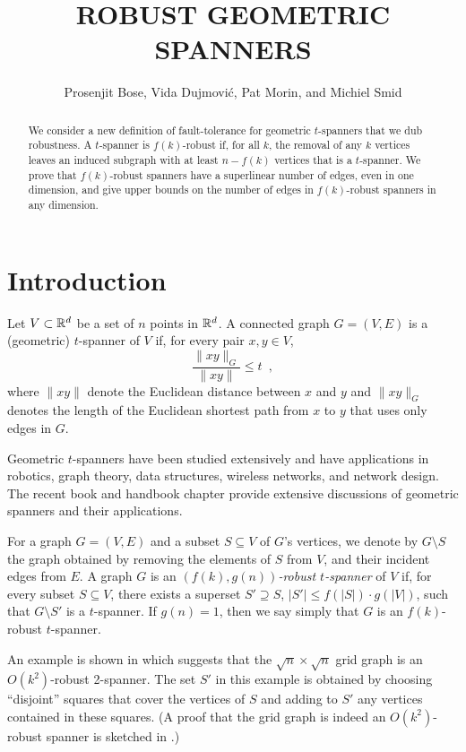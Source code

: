 \documentclass{patmorin}
\title{\MakeUppercase{Robust Geometric Spanners}}
\author{Prosenjit Bose, Vida Dujmovi\'c, Pat Morin, and Michiel Smid}
\begin{document}
\maketitle

\begin{abstract}
  We consider a new definition of fault-tolerance for geometric
  $t$-spanners that we dub robustness.  A $t$-spanner is $f(k)$-robust
  if, for all $k$, the removal of any $k$ vertices leaves an induced
  subgraph with at least $n-f(k)$ vertices that is a $t$-spanner.
  We prove that $f(k)$-robust spanners have a superlinear number of
  edges, even in one dimension, and give upper bounds on the number of
  edges in $f(k)$-robust spanners in any dimension.
\end{abstract}

\section{Introduction}

Let $V\subset \mathbb{R}^d$ be a set of $n$ points in $\mathbb{R}^d$.  A connected
graph $G=(V,E)$ is a (geometric) $t$-spanner of $V$ if, for every pair
$x,y\in V$,
\[
  \frac{\|xy\|_G}{\|xy\|} \le t \enspace ,
\]
where $\|xy\|$ denote the Euclidean distance between $x$ and $y$ and
$\|xy\|_G$ denotes the length of the Euclidean shortest path from $x$
to $y$ that uses only edges in $G$.

Geometric $t$-spanners have been studied extensively and have applications
in robotics, graph theory, data structures, wireless networks, and
network design.  The recent book \cite{ns07} and handbook chapter
\cite{e99} provide extensive discussions of geometric spanners and
their applications.

For a graph $G=(V,E)$ and a subset $S\subseteq V$ of $G$'s vertices,
we denote by $G\setminus S$ the graph obtained by removing the elements
of $S$ from $V$, and their incident edges from $E$.  A graph $G$ is an
\emph{$(f(k),g(n))$-robust $t$-spanner} of $V$ if, for every subset
$S\subseteq V$, there exists a superset $S'\supseteq S$, $|S'|\le
f(|S|)\cdot g(|V|)$, such that $G\setminus S'$ is a $t$-spanner.
If $g(n)=1$, then we say simply that $G$ is an $f(k)$-robust $t$-spanner.

An example is shown in  which suggests that the
$\sqrt{n}\times\sqrt{n}$ grid graph is an $O(k^2)$-robust 2-spanner.
The set $S'$ in this example is obtained by choosing ``disjoint''
squares that cover the vertices of $S$ and adding to $S'$ any vertices
contained in these squares.  (A proof that the grid graph is indeed an
$O(k^2)$-robust spanner is sketched in .)
\end{document}
